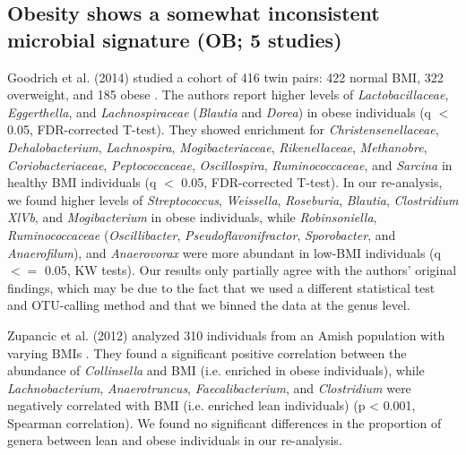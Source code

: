 {\subsection*{Obesity shows a somewhat inconsistent microbial signature (OB; 5 studies)}

Goodrich et al. (2014) studied a cohort of 416 twin pairs: 422 normal BMI, 322 overweight, and 185 obese \cite{ob-goodrich}.
The authors report higher levels of \textit{Lactobacillaceae}, \textit{Eggerthella}, and \textit{Lachnospiraceae} (\textit{Blautia} and \textit{Dorea}) in obese individuals (q $<$ 0.05, FDR-corrected T-test).
They showed enrichment for \textit{Christensenellaceae}, \textit{Dehalobacterium}, \textit{Lachnospira}, \textit{Mogibacteriaceae}, \textit{Rikenellaceae}, \textit{Methanobre}, \textit{Coriobacteriaceae}, \textit{Peptococcaceae}, \textit{Oscillospira}, \textit{Ruminococcaceae}, and \textit{Sarcina} in healthy BMI individuals (q $<$ 0.05, FDR-corrected T-test).
In our re-analysis, we found higher levels of \textit{Streptococcus}, \textit{Weissella}, \textit{Roseburia}, \textit{Blautia}, \textit{Clostridium XlVb}, and \textit{Mogibacterium} in obese individuals, while \textit{Robinsoniella}, \textit{Ruminococcaceae} (\textit{Oscillibacter}, \textit{Pseudoflavonifractor}, \textit{Sporobacter}, and \textit{Anaerofilum}), and \textit{Anaerovorax} were more abundant in low-BMI individuals (q $<=$ 0.05, KW tests).
Our results only partially agree with the authors' original findings, which may be due to the fact that we used a different statistical test and OTU-calling method and that we binned the data at the genus level.

Zupancic et al. (2012) analyzed 310 individuals from an Amish population with varying BMIs \cite{ob-zupancic}.
They found a significant positive correlation between the abundance of \textit{Collinsella} and BMI (i.e. enriched in obese individuals), while \textit{Lachnobacterium}, \textit{Anaerotruncus}, \textit{Faecalibacterium}, and \textit{Clostridium} were negatively correlated with BMI (i.e. enriched lean individuals) (p < 0.001, Spearman correlation).
We found no significant differences in the proportion of genera between lean and obese individuals in our re-analysis.

}
